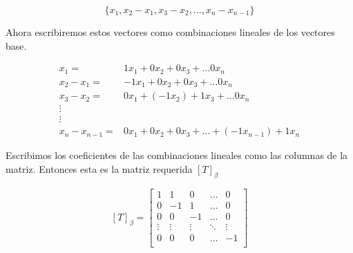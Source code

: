 $$\{x_1, x_2 - x_1, x_3 - x_2, \ldots, x_n - x_{n-1}\}$$

Ahora escribiremos estos vectores como combinaciones lineales de los vectores base.

 \begin{align*}
    x_{1} = & 1x_{1} + 0x_{2} + 0x_{3} + \ldots 0 x_{n} \\
    x_{2} - x_{1} = & -1x_{1} + 0x_{2} + 0x_{3} + \ldots 0 x_{n} \\
    x_{3} - x_{2} = & 0x_{1} + (-1x_{2})  + 1x_{3} + \ldots 0 x_{n}  \\
    \vdots & \\
    \vdots & \\
    x_{n} - x_{n-1} = & 0x_{1} + 0x_{2} + 0x_{3} + \ldots + (-1x_{n-1}) + 1x_{n}
\end{align*}


\noindent Escribimos los coeficientes de las combinaciones lineales como las columnas de la matriz.
Entonces esta es la matriz requerida $ \left[ T \right]_{\beta}$


\[
\left[ T \right]_{\beta} = 
\begin{bmatrix}
    1 & 1  &  0 & \ldots & 0 \\
    0 & -1 &  1 & \ldots & 0 \\
    0 &  0 & -1 & \ldots & 0 \\
    \vdots & \vdots & \vdots & \ddots & \vdots \\
    0 &  0 &  0 & \ldots & -1 \\
\end{bmatrix}
\]